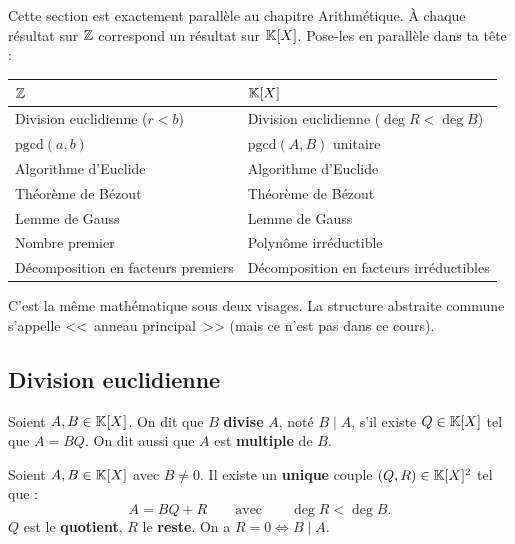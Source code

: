 \begin{intuitionbox}
Cette section est exactement parallèle au chapitre Arithmétique. À chaque résultat sur $\mathbb{Z}$ correspond un résultat sur $\mathbb{K}[X]$. Pose-les en parallèle dans ta tête :

\begin{center}
\renewcommand{\arraystretch}{1.3}
\begin{tabular}{|l|l|}
\hline
\textbf{$\mathbb{Z}$} & \textbf{$\mathbb{K}[X]$} \\
\hline
Division euclidienne ($r < b$) & Division euclidienne ($\deg R < \deg B$) \\
$\text{pgcd}(a,b)$ & $\text{pgcd}(A,B)$ unitaire \\
Algorithme d'Euclide & Algorithme d'Euclide \\
Théorème de Bézout & Théorème de Bézout \\
Lemme de Gauss & Lemme de Gauss \\
Nombre premier & Polynôme irréductible \\
Décomposition en facteurs premiers & Décomposition en facteurs irréductibles \\
\hline
\end{tabular}
\end{center}

C'est la même mathématique sous deux visages. La structure abstraite commune s'appelle <<~anneau principal~>> (mais ce n'est pas dans ce cours).
\end{intuitionbox}

\subsection{Division euclidienne}

\begin{defbox}[--- Divisibilité]
Soient $A, B \in \mathbb{K}[X]$. On dit que $B$ \textbf{divise} $A$, noté $B \mid A$, s'il existe $Q \in \mathbb{K}[X]$ tel que $A = BQ$. On dit aussi que $A$ est \textbf{multiple} de $B$.
\end{defbox}

\begin{thmbox}
Soient $A, B \in \mathbb{K}[X]$ avec $B \neq 0$. Il existe un \textbf{unique} couple $(Q, R) \in \mathbb{K}[X]^2$ tel que :
\[
  A = BQ + R \qquad \text{avec} \qquad \deg R < \deg B.
\]
$Q$ est le \textbf{quotient}, $R$ le \textbf{reste}. On a $R = 0 \iff B \mid A$.
\end{thmbox}

